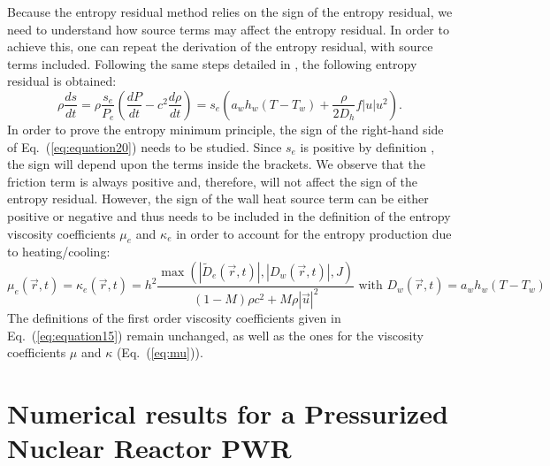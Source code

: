 \documentclass[12pt]{article}
\newcommand{\eqt}[1]{Eq.~(\ref{#1})} %
\begin{document}
Because the entropy residual method relies on the sign of the entropy residual, we need to understand how source terms may affect the entropy residual. In order to achieve this, one can repeat the derivation of the entropy residual,  with source terms included. Following the same steps detailed in \cite{jlg}, the following entropy residual is obtained:
\begin{equation}
\label{eq:equation20}
\rho \frac{ds}{dt} = \rho \frac{s_e}{P_e}\left( \frac{dP}{dt} - c^2 \frac{d \rho}{dt} \right) = s_e \left( a_w h_w (T - T_w) + \frac{\rho}{2 D_h} f |u| u^2 \right) .
\end{equation}
In order to prove the entropy minimum principle, the sign of the right-hand side of \eqt{eq:equation20} needs to be studied. Since $s_e$ is positive by definition \cite{jlg}, the sign will depend upon the terms inside the brackets. We observe that the friction term is always positive and, therefore, will not affect the sign of the entropy residual. However, the sign of the wall heat source term can be either positive or negative and thus needs to be included in the definition of the entropy viscosity coefficients $\mu_e$ and $\kappa_e$ in order to account for the entropy production due to heating/cooling:
\begin{equation}
\label{eq:equation21}
\mu_e(\vec{r},t) = \kappa_e(\vec{r},t) = h^2 \frac{\max\left( | \tilde{D}_e(\vec{r},t) |, | D_w(\vec{r},t) |, J \right)}{(1-M) \rho c^2 + M \rho |\vec{u}|^2} \text{ with } D_w(\vec{r},t) = a_w h_w (T - T_w)
\end{equation}
The definitions of the first order viscosity coefficients given in \eqt{eq:equation15} remain unchanged, as well as the ones for the viscosity coefficients $\mu$ and $\kappa$ (\eqt{eq:mu}).

%
\section{Numerical results for a Pressurized Nuclear Reactor PWR}
\label{sec:results}
\end{document}
